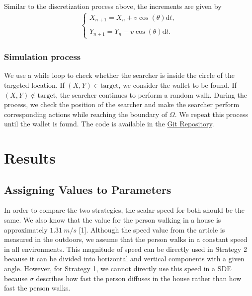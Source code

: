 \documentclass{article}
\begin{document}
\vspace{5mm}

\noindent Similar to the discretization process above, the increments are given by 
\begin{align*}
    \begin{cases}
        X_{n+1} = X_n + v\cos(\theta)\mathrm{d}t, \\
        \\
        Y_{n+1} = Y_n + v\cos(\theta)\mathrm{d}t.
    \end{cases}
\end{align*}

\subsubsection*{Simulation process}
We use a while loop to check whether the searcher is inside the circle of the targeted location. If $(X, Y)\in\text{target}$, we consider the wallet to be found. If $(X, Y)\notin\text{target}$, the searcher continues to perform a random walk. During the process, we check the position of the searcher and make the searcher perform corresponding actions while reaching the boundary of $\Omega$. We repeat this process until the wallet is found. The code is available in the \href{https://github.com/tusm06/MATH461_Unit03}{Git Repository}.

\section{Results}
\subsection{Assigning Values to Parameters}
In order to compare the two strategies, the scalar speed for both should be the same. We also know that the value for the person walking in a house is approximately $1.31\ m/s$ [1]. Although the speed value from the article is measured in the outdoors, we assume that the person walks in a constant speed in all environments. This magnitude of speed can be directly used in Strategy 2 because it can be divided into horizontal and vertical components with a given angle. However, for Strategy 1, we cannot directly use this speed in a SDE because $\sigma$ describes how fast the person diffuses in the house rather than how fast the person walks. 

\vspace{5mm}
\end{document}
